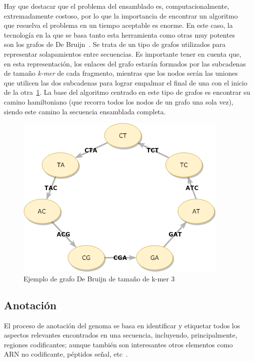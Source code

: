 Hay que destacar que el problema del ensamblado es, computacionalmente, extremadamente costoso, por lo que la importancia de encontrar un algoritmo que resuelva el problema en un tiempo aceptable es enorme. En este caso, la tecnología en la que se basa tanto esta herramienta como otras muy potentes~\cite{Zerbino2008} son los grafos de De Bruijn~\cite{Compeau2011}. Se trata de un tipo de grafos utilizados para representar solapamientos entre secuencias. Es importante tener en cuenta que, en esta representación, los enlaces del grafo estarán formados por las subcadenas de tamaño \textit{k-mer} de cada fragmento, mientras que los nodos serán las uniones que utilicen las dos subcadenas para lograr empalmar el final de una con el inicio de la otra~\ref{fig:DeBruijn}. La base del algoritmo centrado en este tipo de grafos es encontrar su camino hamiltoniano (que recorra todos los nodos de un grafo una sola vez), siendo este camino la secuencia ensamblada completa.

\begin{figure}
    \begin{center}
      \includegraphics[scale=0.5]{images/DeBruijnGraph.png}
      \caption{Ejemplo de grafo De Bruijn de tamaño de  k-mer 3}
      \label{fig:DeBruijn}
    \end{center}
\end{figure}

\subsection{Anotación}
El proceso de anotación del genoma se basa en identificar y etiquetar todos los aspectos relevantes encontrados en una secuencia, incluyendo, principalmente, regiones codificantes; aunque también son interesantes otros elementos como ARN no codificante, péptidos señal, etc~\cite{RichardsonWatson2012}. 

